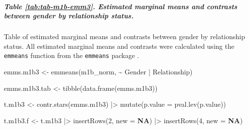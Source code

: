 \documentclass[
  bookmarksnumbered]{article}
\newenvironment{Shaded}{\begin{snugshade}}{\end{snugshade}}
\newcommand{\AttributeTok}[1]{\textcolor[rgb]{0.80,0.80,0.80}{#1}}
\newcommand{\ConstantTok}[1]{\textcolor[rgb]{0.86,0.64,0.64}{\textbf{#1}}}
\newcommand{\DecValTok}[1]{\textcolor[rgb]{0.86,0.86,0.80}{#1}}
\newcommand{\FunctionTok}[1]{\textcolor[rgb]{0.94,0.94,0.56}{#1}}
\newcommand{\NormalTok}[1]{\textcolor[rgb]{0.80,0.80,0.80}{#1}}
\newcommand{\OtherTok}[1]{\textcolor[rgb]{0.94,0.94,0.56}{#1}}
\newcommand{\SpecialCharTok}[1]{\textcolor[rgb]{0.86,0.64,0.64}{#1}}
\begin{document}
\subparagraph{Table \ref{tab:tab-m1b-emm3}. Estimated marginal means and contrasts between gender by relationship status.}\label{table-reftabtab-m1b-emm3.-estimated-marginal-means-and-contrasts-between-gender-by-relationship-status.}

Table of estimated marginal means and contrasts between gender by relationship status. All estimated marginal means and contrasts were calculated using the \texttt{emmeans} function from the \texttt{emmeans} package \autocite{emmeanscit}.

\begin{Shaded}
\begin{Highlighting}[]
\NormalTok{emms.m1b3 }\OtherTok{\textless{}{-}} \FunctionTok{emmeans}\NormalTok{(m1b\_norm, }\SpecialCharTok{\textasciitilde{}}\NormalTok{ Gender }\SpecialCharTok{|}\NormalTok{ Relationship)}

\NormalTok{emms.m1b3.tab }\OtherTok{\textless{}{-}} \FunctionTok{tibble}\NormalTok{(}\FunctionTok{data.frame}\NormalTok{(emms.m1b3))}

\NormalTok{t.m1b3 }\OtherTok{\textless{}{-}} \FunctionTok{contr.stars}\NormalTok{(emms.m1b3) }\SpecialCharTok{|\textgreater{}} 
  \FunctionTok{mutate}\NormalTok{(}\AttributeTok{p.value =} \FunctionTok{pval.lev}\NormalTok{(p.value))}

\NormalTok{t.m1b3.f }\OtherTok{\textless{}{-}}\NormalTok{ t.m1b3 }\SpecialCharTok{|\textgreater{}} 
  \FunctionTok{insertRows}\NormalTok{(}\DecValTok{2}\NormalTok{, }\AttributeTok{new =} \ConstantTok{NA}\NormalTok{) }\SpecialCharTok{|\textgreater{}}
\FunctionTok{insertRows}\NormalTok{(}\DecValTok{4}\NormalTok{, }\AttributeTok{new =} \ConstantTok{NA}\NormalTok{)}


\end{Highlighting}
\end{Shaded}
\end{document}
